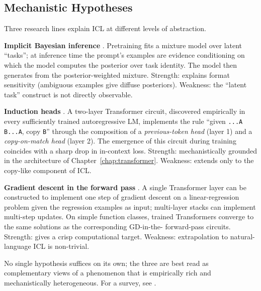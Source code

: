 \subsection{Mechanistic Hypotheses}

Three research lines explain ICL at different levels of abstraction.

\textbf{Implicit Bayesian inference}
\citep{xie2022explanation}. Pretraining fits a mixture model over
latent ``tasks''; at inference time the prompt's examples are
evidence conditioning on which the model computes the posterior over
task identity. The model then generates from the posterior-weighted
mixture. Strength: explains format sensitivity (ambiguous examples
give diffuse posteriors). Weakness: the ``latent task'' construct is
not directly observable.

\textbf{Induction heads} \citep{olsson2022induction}. A two-layer
Transformer circuit, discovered empirically in every sufficiently
trained autoregressive LM, implements the rule ``given
\texttt{...A B...A}, copy \texttt{B}'' through the composition of a
\emph{previous-token head} (layer 1) and a \emph{copy-on-match head}
(layer 2). The emergence of this circuit during training coincides
with a sharp drop in in-context loss. Strength: mechanistically
grounded in the architecture of Chapter~\ref{chap:transformer}. Weakness: extends only to
the copy-like component of ICL.

\textbf{Gradient descent in the forward pass}
\citep{garg2022transformers,vonoswald2023transformers}. A single
Transformer layer can be constructed to implement one step of
gradient descent on a linear-regression problem given the
regression examples as input; multi-layer stacks can implement
multi-step updates. On simple function classes, trained Transformers
converge to the same solutions as the corresponding GD-in-the-
forward-pass circuits. Strength: gives a crisp computational target.
Weakness: extrapolation to natural-language ICL is non-trivial.

No single hypothesis suffices on its own; the three are best read as
complementary views of a phenomenon that is empirically rich and
mechanistically heterogeneous. For a survey, see
\citet{dong2023survey}.

